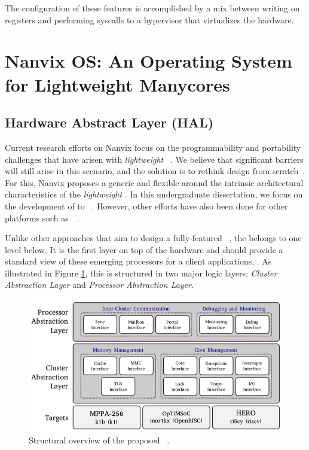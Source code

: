 	The configuration of these features is accomplished by a mix between
	writing on \dma registers and performing syscalls to a hypervisor
	that virtualizes the \mppa hardware.

\section{Nanvix OS: An Operating System for Lightweight Manycores}
\label{sec.nanvix}


	\subsection{Hardware Abstract Layer (HAL)}

		Current research efforts on Nanvix focus on the programmability and portability
		challenges that have arisen with \textit{lightweight \manycores}~\cite{christgau2017, gamell2012, serres2011}.
		We believe that significant barriers will still arise in this scenario, and the solution is to rethink \os design from
		scratch~\cite{penna:compas19, penna2019}. For this, Nanvix proposes a generic and flexible \hal around the
		intrinsic architectural characteristics of the \textit{lightweight \manycores}. In this undergraduate dissertation, we 
		focus on the development of \hal to \mppa~\cite{DeDinechin2013-1}. However, other efforts have also been
		done for other platforms such as~\optimsoc~\cite{Wallentowitz2013}.

	        	Unlike other approaches that aim to design a fully-featured \os~\cite{Baumann2009,kluge2014,nightingale2009,rhoden2011},
	        	the \hal belongs to one level below.
	        	It is the first layer on top of the hardware and should provide a standard
	        	view of these emerging processors for a client applications, \eg \os.
	        	As illustrated in Figure \ref{fig.hal-struct}, this \hal is structured in
	        	two major logic layers: \textit{Cluster Abstraction Layer} and \textit{Processor Abstraction Layer}.

	        	\begin{figure}[h]
	        	\centering
	        	\includegraphics[width=.9\textwidth]{images/hal-struct.png}

		        	\caption{
		        	Structural overview of the proposed \hal~\cite{penna:compas2019}.
		}\par
		\label{fig.hal-struct}
		\end{figure}

